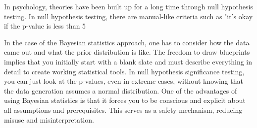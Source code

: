 \documentclass{ltjsbook}
\begin{document}
In psychology, theories have been built up for a long time through null hypothesis testing. In null hypothesis testing, there are manual-like criteria such as "it's okay if the p-value is less than 5%

In the case of the Bayesian statistics approach, one has to consider how the data came out and what the prior distribution is like. The freedom to draw blueprints implies that you initially start with a blank slate and must describe everything in detail to create working statistical tools. In null hypothesis significance testing, you can just look at the p-values, even in extreme cases, without knowing that the data generation assumes a normal distribution. One of the advantages of using Bayesian statistics is that it forces you to be conscious and explicit about all assumptions and prerequisites. This serves as a safety mechanism, reducing misuse and misinterpretation.
\end{document}
